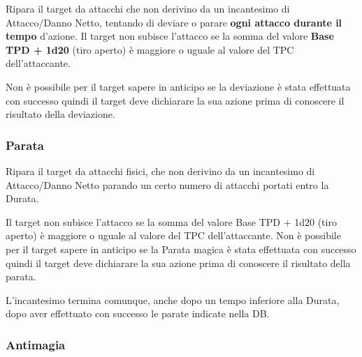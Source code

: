 Ripara il target da attacchi che non derivino da un incantesimo di
Attacco/Danno Netto, tentando di deviare o parare \textbf{ogni attacco
  durante il tempo} d'azione. Il target non subisce l'attacco se la
somma del valore \textbf{Base TPD + 1d20} (tiro aperto) \`e maggiore
o uguale al valore del TPC dell'attaccante.

Non \`e possibile per il target sapere in anticipo se la deviazione
\`e stata effettuata con successo quindi il target deve dichiarare
la sua azione prima di conoscere il risultato della deviazione.


\bigskip
{}

\subsubsection{Parata} 

Ripara il target da attacchi fisici, che non derivino da un
incantesimo di Attacco/Danno Netto parando un certo numero di attacchi
portati entro la Durata. 

Il target non subisce l'attacco se la somma
del valore Base TPD + 1d20 (tiro aperto) \`e maggiore o uguale al
valore del TPC dell'attaccante. Non \`e possibile per il target
sapere in anticipo se la Parata magica \`e stata effettuata con successo
quindi il target deve dichiarare la sua azione prima di conoscere il
risultato della parata. 

L'incantesimo termina comunque, anche dopo un tempo inferiore alla
Durata, dopo aver effettuato con successo le parate indicate nella DB.




\subsubsection{Antimagia}  

